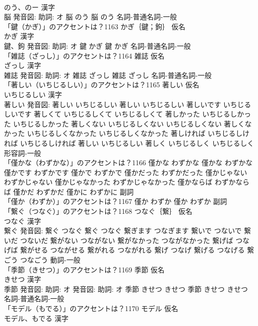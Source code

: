 \documentclass[8pt]{extreport}
\begin{document}
\begin{CJK}{UTF8}{min}
\\	のう、のー 漢字　
\\	脳 発音図: 助詞: オ	脳 のう		脳 のう				名詞-普通名詞-一般 
\\	「鍵（かぎ）」のアクセントは？1163	かぎ｛鍵；鉤｝ 仮名　
\\	かぎ 漢字　
\\	鍵、鉤 発音図: 助詞: オ	鍵 かぎ		鍵 かぎ				名詞-普通名詞-一般 
\\	「雑誌（ざっし）」のアクセントは？1164	雑誌 仮名　
\\	ざっし 漢字　
\\	雑誌 発音図: 助詞: オ	雑誌 ざっし		雑誌 ざっし				名詞-普通名詞-一般 
\\	「著しい（いちじるしい）」のアクセントは？1165	著しい 仮名　
\\	いちじるしい 漢字　
\\	著しい 発音図:	著しい いちじるしい		著しい いちじるしい 著しいです いちじるしいです 著しくて いちじるしくて いちじるしくて 著しかった いちじるしかった いちじるしかった 著しくない いちじるしくない いちじるしくない 著しくなかった いちじるしくなかった いちじるしくなかった 著しければ いちじるしければ いちじるしければ 著しい いちじるしい 著しく いちじるしく いちじるしく				形容詞-一般 
\\	「僅かな（わずかな）」のアクセントは？1166		僅かな わずかな		僅かな わずかな 僅かです わずかです 僅かで わずかで 僅かだった わずかだった 僅かじゃない わずかじゃない 僅かじゃなかった わずかじゃなかった 僅かならば わずかならば 僅かだ わずかだ 僅かに わずかに				副詞 
\\	「僅か（わずか）」のアクセントは？1167		僅か わずか		僅か わずか				副詞 
\\	「繋ぐ（つなぐ）」のアクセントは？1168	つなぐ｛繋｝ 仮名　
\\	つなぐ 漢字　
\\	繋ぐ 発音図:	繋ぐ つなぐ		繋ぐ つなぐ 繋ぎます つなぎます 繋いで つないで 繋いだ つないだ 繋がない つながない 繋がなかった つながなかった 繋げば つなげば 繋がせる つながせる 繋がれる つながれる 繋げ つなげ 繋げる つなげる 繋ごう つなごう				動詞-一般 
\\	「季節（きせつ）」のアクセントは？1169	季節 仮名　
\\	きせつ 漢字　
\\	季節 発音図: 助詞: オ 発音図: 助詞: オ	季節 きせつ きせつ		季節 きせつ きせつ				名詞-普通名詞-一般 
\\	「モデル（もでる）」のアクセントは？1170	モデル 仮名　
\\	モデル、もでる 漢字　

\end{CJK}
\end{document}
